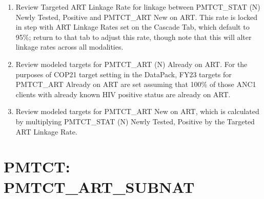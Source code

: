 \documentclass[
  openany]{book}
\begin{document}
\begin{enumerate}
\def\labelenumi{\arabic{enumi}.}
\item
  Review Targeted ART Linkage Rate for linkage between PMTCT\_STAT (N)
  Newly Tested, Positive and PMTCT\_ART New on ART. This rate is locked
  in step with ART Linkage Rates set on the Cascade Tab, which default
  to 95\%; return to that tab to adjust this rate, though note that
  this will alter linkage rates across all modalities.
\item
  Review modeled targets for PMTCT\_ART (N) Already on ART. For the
  purposes of COP21 target setting in the DataPack, FY23 targets for
  PMTCT\_ART Already on ART are set assuming that 100\% of those ANC1
  clients with already known HIV positive status are already on ART.
\item
  Review modeled targets for PMTCT\_ART New on ART, which is calculated
  by multiplying PMTCT\_STAT (N) Newly Tested, Positive by the Targeted
  ART Linkage Rate.
\end{enumerate}

\hypertarget{pmtct-pmtct_art_subnat}{%
\section{PMTCT: PMTCT\_ART\_SUBNAT}\label{pmtct-pmtct_art_subnat}}

\begin{table}
\centering\begingroup\fontsize{12}{14}\selectfont

\endgroup{}
\end{table}
\end{document}
